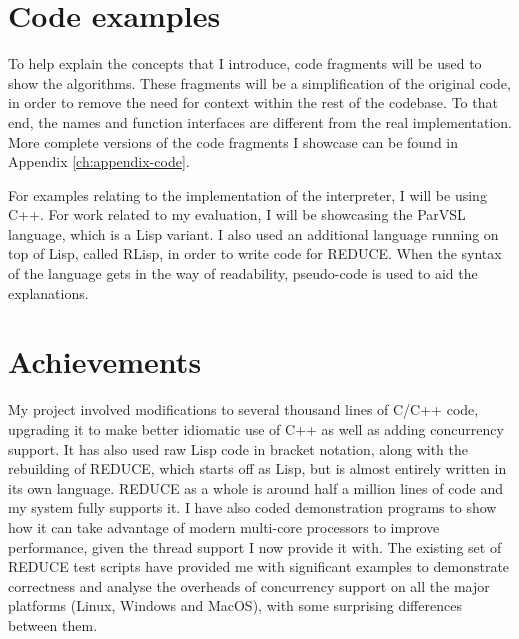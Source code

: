\section{Code examples}

To help explain the concepts that I introduce, code fragments will be used to show the algorithms.
These fragments will be a simplification of the original code, in order to remove the need
for context within the rest of the codebase. To that end, the names and function interfaces
are different from the real implementation. More complete versions of the code fragments
I showcase can be found in Appendix \ref{ch:appendix-code}.

For examples relating to the implementation of the interpreter, I will be using C++.
For work related to my evaluation, I will be showcasing the ParVSL language, which is a
Lisp variant. I also used an additional language running on top of Lisp, called RLisp,
in order to write code for REDUCE.
When the syntax of the language gets in the way of readability,
pseudo-code is used to aid the explanations.

\section{Achievements}
\label{sec:achievements}

My project involved modifications to several thousand lines of C/C++ code, upgrading it to
make better idiomatic use of C++ as well as adding concurrency support. It has also used raw
Lisp code in bracket notation, along with the rebuilding of REDUCE, which starts off as Lisp,
but is almost entirely written in its own language. REDUCE as a whole is around half a million
lines of code and my system fully supports it. I have also coded demonstration programs to
show how it can take advantage of modern multi-core processors to improve performance,
given the thread support I now provide it with. The existing set of REDUCE test scripts have provided me
with significant examples to demonstrate correctness and analyse the overheads of
concurrency support on all the major platforms (Linux, Windows and MacOS), with some surprising
differences between them.